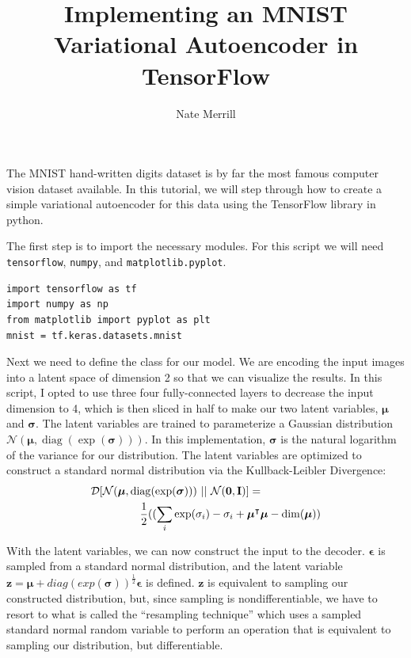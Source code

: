 \documentclass[10 pt]{article}
\newcommand{\diag}{\mathop{\mathrm{diag}}}
\begin{document}
\title{ \LARGE \bf Implementing an MNIST Variational Autoencoder in TensorFlow}

\author{Nate Merrill}

\maketitle

The MNIST hand-written digits dataset is by far the most famous computer vision
dataset available. In this tutorial, we will step through how to create a simple 
variational autoencoder for this data using the TensorFlow library in python.

The first step is to import the necessary modules. For this script we 
will need \texttt{tensorflow}, \texttt{numpy}, and \texttt{matplotlib.pyplot}.

\begin{lstlisting}
import tensorflow as tf
import numpy as np
from matplotlib import pyplot as plt
mnist = tf.keras.datasets.mnist
\end{lstlisting}

Next we need to define the class for our model.
We are encoding the input images into a latent space of dimension 2 so that we can visualize the results.
In this script, I opted to use three four fully-connected layers to decrease the input dimension to
4, which is then sliced in half to make our two latent variables, 
$\boldsymbol{\mu}$ and $\boldsymbol{\sigma}$. 
The latent variables are trained to parameterize a Gaussian distribution $\mathcal{N}(\boldsymbol{\mu}, \diag(\exp(\boldsymbol{\sigma})))$.
In this implementation, $\boldsymbol{\sigma}$ is the natural logarithm of the variance for our distribution.
The latent variables are optimized to construct a standard normal distribution via the Kullback-Leibler Divergence:
\begin{align}
    \mathcal{D}[\mathcal{N}(\boldsymbol{\mu}, \diag(\exp(\boldsymbol{\sigma})))\ ||\ 
    \mathcal{N}(\mathbf{0}, \mathbf{I})] = \notag\ \ & \\
    \frac{1}{2}((\sum_i \exp(\sigma_i) - \sigma_i + \boldsymbol{\mu}^\intercal\boldsymbol{\mu}& - 
    \dim(\boldsymbol{\mu})) 
\end{align}

With the latent variables, we can now construct the input to the decoder.
$\boldsymbol{\epsilon}$ is sampled from a standard normal distribution, and the latent variable $\mathbf{z} = \boldsymbol{\mu} + diag(exp(\boldsymbol \sigma))^{\frac{1}{2}}\boldsymbol{\epsilon}$ is defined.
%
$\mathbf{z}$ is equivalent to sampling our constructed distribution, but, since sampling
is nondifferentiable, we have to resort to what is called the ``resampling technique'' which
uses a sampled standard normal random variable to perform an operation that is equivalent to 
sampling our distribution, but differentiable.
\end{document}
